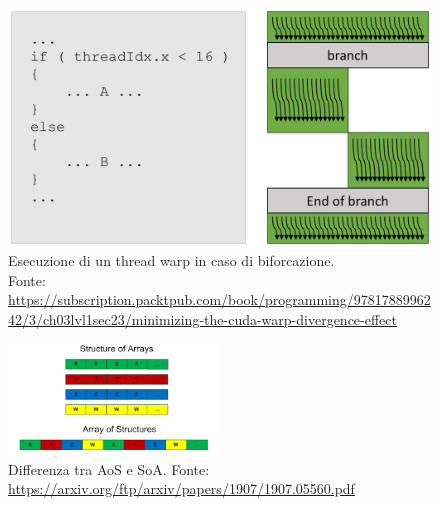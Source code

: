 \documentclass[12pt,a4paper,oneside]{book}
\begin{document}
	\begin{figure}[!ht]
		\centering
		\includegraphics[width=0.7\linewidth]{thread-warp}
		\caption[Esecuzione di un thread warp in caso di biforcazione]{Esecuzione di un thread warp in caso di biforcazione.\\Fonte: \url{https://subscription.packtpub.com/book/programming/9781788996242/3/ch03lvl1sec23/minimizing-the-cuda-warp-divergence-effect}}
		\label{fig:thread-warp}
	\end{figure}

	\begin{figure}
		\centering
		\includegraphics[width=0.5\textwidth]{aos-vs-soa}
		\caption[Differenza tra Aos e SoA]{Differenza tra AoS e SoA. Fonte: \url{https://arxiv.org/ftp/arxiv/papers/1907/1907.05560.pdf}}
		\label{fig:aos-vs-soa}
	\end{figure}
\end{document}
